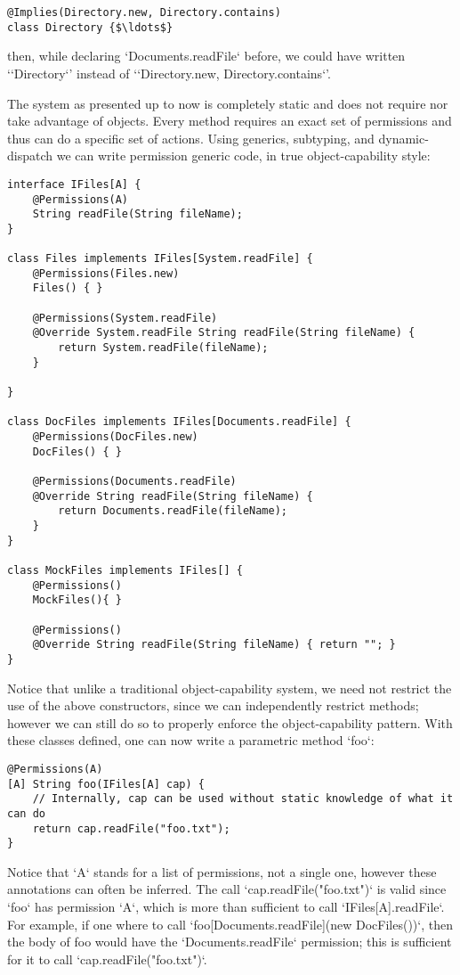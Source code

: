 \documentclass[a4paper,twoside,british,9pt]{extarticle}
\providecommand*{\code}[1]{\Q`#1`}
\begin{document}
\begin{lstlisting}
@Implies(Directory.new, Directory.contains)
class Directory {$\ldots$}
\end{lstlisting}

then, while declaring \code{Documents.readFile} before, we could
have written `\code{Directory}' instead of `\code{Directory.new, Directory.contains}'.

The system as presented up to now is completely static and does not
require nor take advantage of objects. Every method requires an exact
set of permissions and thus can do a specific set of actions. Using
generics, subtyping, and dynamic-dispatch we can write permission generic code,
in true object-capability style:

\begin{lstlisting}
interface IFiles[A] {
	@Permissions(A)
	String readFile(String fileName);
}

class Files implements IFiles[System.readFile] {
	@Permissions(Files.new)
	Files() { }

	@Permissions(System.readFile)
	@Override System.readFile String readFile(String fileName) { 
		return System.readFile(fileName); 
	}
	
}

class DocFiles implements IFiles[Documents.readFile] {
	@Permissions(DocFiles.new)
	DocFiles() { }

	@Permissions(Documents.readFile)
	@Override String readFile(String fileName) { 
		return Documents.readFile(fileName); 
	}
}

class MockFiles implements IFiles[] {
	@Permissions()
	MockFiles(){ }

	@Permissions()
	@Override String readFile(String fileName) { return ""; }
}
\end{lstlisting}

Notice that unlike a traditional object-capability system, we need
not restrict the use of the above constructors, since we can independently
restrict methods; however we can still do so to properly enforce the
object-capability pattern. With these classes defined, one can now
write a parametric method \code{foo}:

\begin{lstlisting}
@Permissions(A)
[A] String foo(IFiles[A] cap) {
	// Internally, cap can be used without static knowledge of what it can do
	return cap.readFile("foo.txt");
}
\end{lstlisting}

Notice that \code{A} stands for a list of permissions, not a single
one, however these annotations can often be inferred. The call \code{cap.readFile("foo.txt")}
is valid since \code{foo} has permission \code{A}, which is more
than sufficient to call \code{IFiles[A].readFile}.
For example, if one where to call \code{foo[Documents.readFile](new DocFiles())}, 
then the body of foo would have the \code{Documents.readFile} permission; this is sufficient for it to call
\code{cap.readFile("foo.txt")}.
\end{document}
